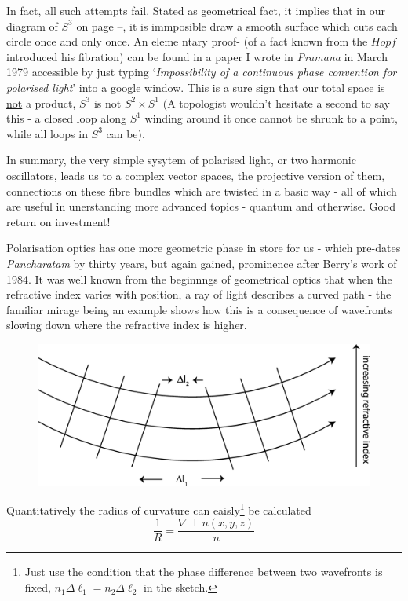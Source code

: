 In fact, all such attempts fail. Stated as geometrical fact, it implies that
in our diagram of $S^3$ on page --, it is immposible draw a smooth surface which
cuts each circle once and only once. An eleme ntary proof- (of a fact known
from the $Hopf$ introduced his fibration) can be found in a paper I wrote in
\textit{Pramana} in March 1979 accessible by just typing `\textit{Impossibility of a continuous
phase convention for polarised light}' into a google window. This is a sure sign
that our total space is \underline{not} a product, $S^3$ is not $S^2 \times S^1$ (A topologist wouldn't
hesitate a second to say this - a closed loop along $S^1$ winding around it once
cannot be shrunk to a point, while all loops in $S^3$ can be).

In summary, the very simple sysytem of polarised light, or two harmonic
oscillators, leads us to a complex vector spaces, the projective version of them,
connections on these fibre bundles which are twisted in a basic way - all of which
are useful in unerstanding more advanced topics - quantum and otherwise. Good
return on investment!

Polarisation optics has one more geometric phase in store for us - which pre-dates \textit{Pancharatam} by thirty years, but again gained, prominence after Berry's work of 1984. It was well known from the beginnngs of geometrical optics that
when the refractive index varies with position, a ray of light describes a curved
path - the familiar mirage being an example shows how this is a consequence of
wavefronts slowing down where the refractive index is higher.
\begin{figure}[H]
\centering
\includegraphics[scale=0.15]{src/images/chap26/19.eps}
\end{figure}

Quantitatively the radius of curvature can eaisly\footnote{Just use the condition that the phase difference between two wavefronts is fixed, $n_1 \Delta \ell_1 = n_2 \Delta \ell_2$ in the sketch.} be calculated
$$
\frac{1}{R} = \frac{\nabla \perp n (x,y,z)}{n}
$$


